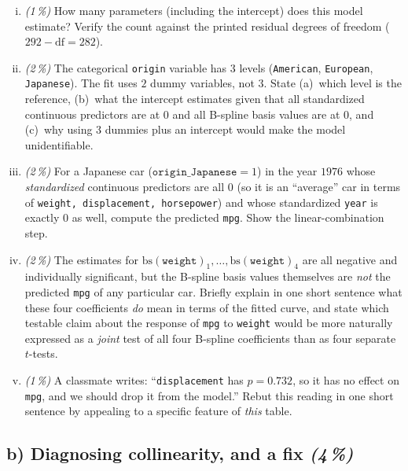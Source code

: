 \documentclass[11pt,a4paper]{article}
\newcommand{\subpoints}[1]{\textit{(#1\,\%)}}
\begin{document}
\begin{enumerate}[(i)]
  \item \subpoints{1} How many parameters (including the intercept) does this model estimate? Verify the count against the printed residual degrees of freedom ($292 - \text{df} = 282$).

  \item \subpoints{2} The categorical \texttt{origin} variable has $3$ levels (\texttt{American}, \texttt{European}, \texttt{Japanese}). The fit uses $2$ dummy variables, not $3$. State (a)~which level is the reference, (b)~what the intercept estimates given that all standardized continuous predictors are at $0$ and all B-spline basis values are at $0$, and (c)~why using $3$ dummies plus an intercept would make the model unidentifiable.

  \item \subpoints{2} For a Japanese car ($\texttt{origin\_Japanese}=1$) in the year $1976$ whose \emph{standardized} continuous predictors are all $0$ (so it is an ``average'' car in terms of \texttt{weight, displacement, horsepower}) and whose standardized \texttt{year} is exactly $0$ as well, compute the predicted \texttt{mpg}. Show the linear-combination step.

  \item \subpoints{2} The estimates for $\mathrm{bs}(\texttt{weight})_1, \dots, \mathrm{bs}(\texttt{weight})_4$ are all negative and individually significant, but the B-spline basis values themselves are \emph{not} the predicted \texttt{mpg} of any particular car. Briefly explain in one short sentence what these four coefficients \emph{do} mean in terms of the fitted curve, and state which testable claim about the response of \texttt{mpg} to \texttt{weight} would be more naturally expressed as a \emph{joint} test of all four B-spline coefficients than as four separate $t$-tests.

  \item \subpoints{1} A classmate writes: ``\texttt{displacement} has $p = 0.732$, so it has no effect on \texttt{mpg}, and we should drop it from the model.'' Rebut this reading in one short sentence by appealing to a specific feature of \emph{this} table.
\end{enumerate}

\subsection*{b) Diagnosing collinearity, and a fix \subpoints{4}}
\end{document}
